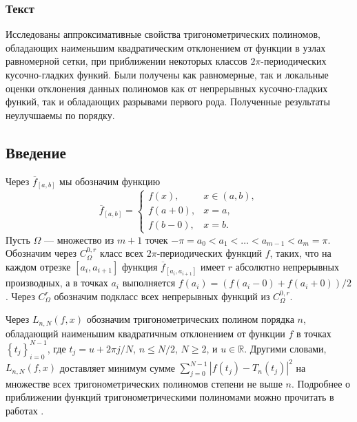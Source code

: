 \subsubsection{Текст}
Исследованы аппроксимативные свойства тригонометрических полиномов, обладающих наименьшим квадратическим отклонением от
функции в узлах равномерной сетки, при приближении некоторых классов $2\pi$-периодических кусочно-гладких функий. 
Были получены как равномерные, так и локальные оценки отклонения данных полиномов как от непрерывных кусочно-гладких функий, 
так и обладающих разрывами первого рода. Полученные результаты неулучшаемы по порядку. 

\subsection{Введение}
Через $\overline{f}_{[a,b]}$ мы обозначим функцию
\begin{equation*}
	\overline{f}_{[a,b]} =
	\begin{cases}
		f(x), & x \in (a,b), \\
		f(a + 0), & x = a,\\
		f(b - 0), & x = b.
	\end{cases}
\end{equation*}
Пусть $\Omega$ --- множество из $m+1$ точек $-\pi=a_{0}<a_{1}<\ldots<a_{m-1}<a_{m}=\pi$.
Обозначим через $C_\Omega^{0,r}$ класс всех $2\pi$-периодических функций $f$,
таких, что на каждом отрезке $[a_i, a_{i+1}]$ функция $\overline{f}_{[a_i, a_{i+1}]}$ имеет
$r$ абсолютно непрерывных производных, а в точках $a_i$ выполняется
 $f(a_i) = (f(a_i - 0) + f(a_i + 0)) / 2$.
Через $C_\Omega^{r}$ обозначим подкласс всех непрерывных функций из $C_\Omega^{0,r}$.

Через $L_{n,N}(f,x)$ обозначим
тригонометрических полином порядка $n$, обладающий наименьшим квадратичным отклонением от функции $f$ в точках $\left\{t_{j}\right\} _{i=0}^{N-1}$,
где $t_{j}=u+2\pi j / N$, $n \leq N/2$, $N \geq 2$, и $u \in \mathbb{R}$.
Другими словами, $L_{n,N}(f,x)$ доставляет минимум сумме
$
\sum_{j=0}^{N-1}\left|f(t_{j})-T_{n}(t_{j})\right|^{2}
$
на множестве всех тригонометрических полиномов степени не выше $n$.
Подробнее о приближении функций тригонометрическими полиномами можно прочитать в работах
\cite{2_bernstein,4_erdos,7_kalashnikov,8_krilov,9_marcinkiewicz,10_marcinkiewicz,11_natanson,12_nikolsky,18_zigmund,17_turetsky}.

